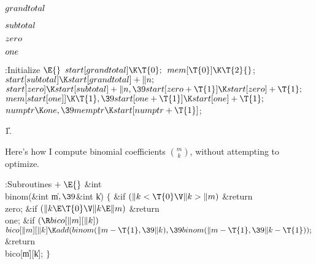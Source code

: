 \Y\B\4\D$\\{grandtotal}$ \5
\par
\B\4\D$\\{subtotal}$ \5
\par
\B\4\D$\\{zero}$ \5
\par
\B\4\D$\\{one}$ \5
\par
\Y\B\4:Initialize \X${}\E{}$\6
$\\{start}[\\{grandtotal}]\K\T{0};{}$\6
${}\\{mem}[\T{0}]\K\T{2}{}$;\6
${}\\{start}[\\{subtotal}]\K\\{start}[\\{grandtotal}]+\|n;{}$\6
${}\\{start}[\\{zero}]\K\\{start}[\\{subtotal}]+\|n,\39\\{start}[\\{zero}+%
\T{1}]\K\\{start}[\\{zero}]+\T{1};{}$\6
${}\\{mem}[\\{start}[\\{one}]]\K\T{1},\39\\{start}[\\{one}+\T{1}]\K\\{start}[%
\\{one}]+\T{1};{}$\6
${}\\{numptr}\K\\{one},\39\\{memptr}\K\\{start}[\\{numptr}+\T{1}]{}$;\par
\U1.\fi

Here's how I compute binomial coefficients $m\choose k$,
without attempting to optimize.

\Y\B\4:Subroutines\X${}\mathrel+\E{}$\6
\&{int} \\{binom}(\&{int} \|m${},\39{}$\&{int} \|k)\1\1\2\2\6
${}\{{}$\1\6
\&{if} ${}(\|k<\T{0}\V\|k>\|m){}$\1\5
\&{return} \\{zero};\2\6
\&{if} ${}(\|k\E\T{0}\V\|k\E\|m){}$\1\5
\&{return} \\{one};\2\6
\&{if} ${}(\R\\{bico}[\|m][\|k]){}$\1\5
${}\\{bico}[\|m][\|k]\K\\{add}(\\{binom}(\|m-\T{1},\39\|k),\39\\{binom}(\|m-%
\T{1},\39\|k-\T{1}));{}$\2\6
\&{return} \\{bico}[\|m][\|k];\6
\4${}\}{}$\2\par
\fi


